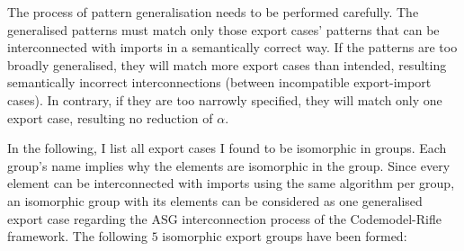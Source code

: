 The process of pattern generalisation needs to be performed carefully. The generalised patterns must match only those export cases' patterns that can be interconnected with imports in a semantically correct way. If the patterns are too broadly generalised, they will match more export cases than intended, resulting semantically incorrect interconnections (between incompatible export-import cases). In contrary, if they are too narrowly specified, they will match only one export case, resulting no reduction of $\alpha$.

In the following, I list all export cases I found to be isomorphic in groups. Each group's name implies why the elements are isomorphic in the group. Since every element can be interconnected with imports using the same algorithm per group, an isomorphic group with its elements can be considered as one generalised export case regarding the ASG interconnection process of the Codemodel-Rifle framework. The following $5$ isomorphic export groups have been formed:

